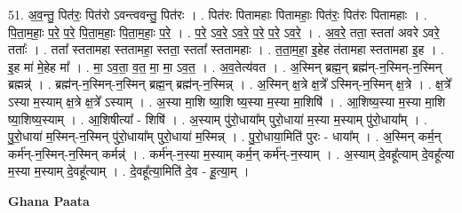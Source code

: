 \documentclass[17pt]{extarticle}
\begin{document}
51. अ॒व॒न्तु॒ पित॑रः॒ पित॑रो ऽवन्त्ववन्तु॒ पित॑रः । . पित॑रः पितामहाः पितामहाः॒ पित॑रः॒ पित॑रः पितामहाः । . पि॒ता॒म॒हाः॒ प॒रे॒ प॒रे॒ पि॒ता॒म॒हाः॒ पि॒ता॒म॒हाः॒ प॒रे॒ । . प॒रे॒ ऽव॒रे॒ ऽव॒रे॒ प॒रे॒ प॒रे॒ ऽव॒रे॒ । . अ॒व॒रे॒ तता॒ स्तता॑ अवरे ऽवरे॒ तताः᳚ । . तता᳚ स्ततामहा स्ततामहा॒ स्तता॒ स्तता᳚ स्ततामहाः । . त॒ता॒म॒हा॒ इ॒हेह त॑तामहा स्ततामहा इ॒ह । . इ॒ह मा॑ मे॒हेह मा᳚ । . मा॒ ऽव॒ता॒ व॒त॒ मा॒ मा॒ ऽव॒त॒ । . अ॒व॒तेत्य॑वत । . अ॒स्मिन् ब्रह्म॒न् ब्रह्म॑न्-न॒स्मिन्-न॒स्मिन् ब्रह्मन्न्॑ । . ब्रह्म॑न्-न॒स्मिन्-न॒स्मिन् ब्रह्म॒न् ब्रह्म॑न्-न॒स्मिन्न् । . अ॒स्मिन् क्ष॒त्रे क्ष॒त्रे᳚ ऽस्मिन्-न॒स्मिन् क्ष॒त्रे । . क्ष॒त्रे᳚ ऽस्या म॒स्याम् क्ष॒त्रे क्ष॒त्रे᳚ ऽस्याम् । . अ॒स्या मा॒शि ष्या॒शि ष्य॒स्या म॒स्या मा॒शिषि॑ । . आ॒शिष्य॒स्या म॒स्या मा॒शि ष्या॒शिष्य॒स्याम् । . आ॒शिषीत्या᳚ - शिषि॑ । . अ॒स्याम् पु॑रो॒धाया᳚म् पुरो॒धाया॑ म॒स्या म॒स्याम् पु॑रो॒धाया᳚म् । . पु॒रो॒धाया॑ म॒स्मिन्-न॒स्मिन् पु॑रो॒धाया᳚म् पुरो॒धाया॑ म॒स्मिन्न् । . पु॒रो॒धाया॒मिति॑ पुरः - धाया᳚म् । . अ॒स्मिन् कर्म॒न् कर्म॑न्-न॒स्मिन्-न॒स्मिन् कर्मन्न्॑ । . कर्म॑न्-न॒स्या म॒स्याम् कर्म॒न् कर्म॑न्-न॒स्याम् । . अ॒स्याम् दे॒वहू᳚त्याम् दे॒वहू᳚त्या म॒स्या म॒स्याम् दे॒वहू᳚त्याम् । . दे॒वहू᳚त्या॒मिति॑ दे॒व - हू॒त्या॒म् । \newline

\textbf{Ghana Paata } \newline
\end{document}
